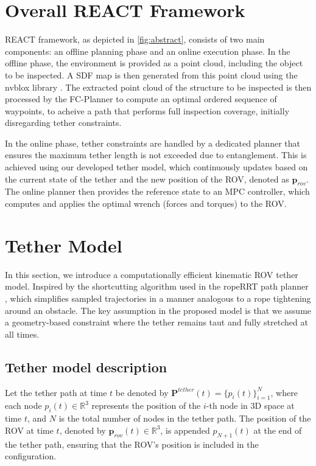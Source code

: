 \section{Overall \ac{REACT}  Framework}
\label{sec:framework}
\ac{REACT} framework, as depicted in \ref{fig:abstract}, consists of two main components: an offline planning phase and an online execution phase. In the offline phase, the environment is provided as a point cloud, including the object to be inspected. A \ac{SDF} map is then generated from this point cloud using the nvblox library \cite{nvblox}. The extracted point cloud of the structure to be inspected is then processed by the FC-Planner \cite{feng2024fc} to compute an optimal ordered sequence of waypoints, to acheive a path that performs full inspection coverage, initially disregarding tether constraints.

In the online phase, tether constraints are handled by a dedicated planner that ensures the maximum tether length is not exceeded due to entanglement. This is achieved using our developed tether model, which continuously updates based on the current state of the tether and the new position of the \ac{ROV}, denoted as $\textbf{p}_{rov}$. The online planner then provides the reference state to an \ac{MPC} controller, which computes and applies the optimal wrench (forces and torques) to the \ac{ROV}.

\section{Tether Model}
\label{sec:tether_model}
In this section, we introduce a computationally efficient kinematic \ac{ROV} tether model. Inspired by the shortcutting algorithm used in the ropeRRT path planner \cite{roperrt}, which simplifies sampled trajectories in a manner analogous to a rope tightening around an obstacle. The key assumption in the proposed model is that we assume a geometry-based constraint where the tether remains taut and fully stretched at all times.

\subsection{Tether model description}
Let the tether path at time \( t \) be denoted by \( \mathbf{P}^{tether}(t) = \{ p_i(t) \}_{i=1}^{N} \), where each node \( p_i(t) \in \mathbb{R}^3 \) represents the position of the \( i \)-th node in 3D space at time \( t \), and \( N \) is the total number of nodes in the tether path. The position of the ROV at time \( t \), denoted by \( \mathbf{p}_{rov}(t) \in \mathbb{R}^3 \), is appended \( p_{N+1}(t) \) at the end of the tether path, ensuring that the ROV's position is included in the configuration. 

